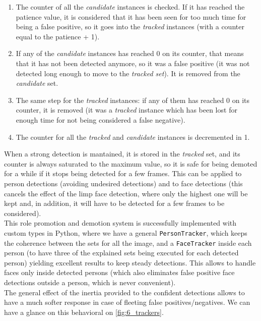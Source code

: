 	\begin{enumerate}
		\item The counter of all the \emph{candidate} instances is checked. If it has reached the patience value, it is considered that it has been seen for too much time for being a false positive, so it goes into the \emph{tracked} instances (with a counter equal to the patience + 1).
		
		\item If any of the \emph{candidate} instances has reached 0 on its counter, that means that it has not been detected anymore, so it was a false positive (it was not detected long enough to move to the \emph{tracked set}). It is removed from the \emph{candidate} set.
		
		\item The same step for the \emph{tracked} instances: if any of them has reached 0 on its counter, it is removed (it was a \emph{tracked} instance which has been lost for enough time for not being considered a false negative).
		
		\item The counter for all the \emph{tracked} and \emph{candidate} instances is decremented in 1.
	\end{enumerate}
	When a strong detection is mantained, it is stored in the \emph{tracked} set, and its counter is always saturated to the maximum value, so it is safe for being demoted for a while if it stops being detected for a few frames. This can be applied to person detections (avoiding undesired detections) and to face detections (this cancels the effect of the limp face detection, where only the highest one will be kept and, in addition, it will have to be detected for a few frames to be considered).\\
	
	This role promotion and demotion system is successfully implemented with custom types in Python, where we have a general \texttt{PersonTracker}, which keeps the coherence between the sets for all the image, and a \texttt{FaceTracker} inside each person (to have three of the explained sets being executed for each detected person) yielding excellent results to keep steady detections. This allows to handle faces only inside detected persons (which also eliminates false positive face detections outside a person, which is never convenient).\\
	
	The general effect of the inertia provided to the confident detections allows to have a much softer response in case of fleeting false positives/negatives. We can have a glance on this behavioral on \autoref{fig:6_trackers}.
	
